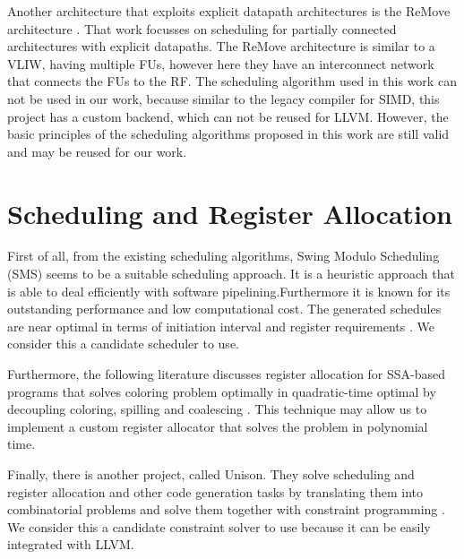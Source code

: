 Another architecture that exploits explicit datapath architectures is the ReMove architecture \cite{remove}. That work focusses on scheduling for partially connected architectures with explicit datapaths. The ReMove architecture is similar to a VLIW, having multiple FUs, however here they have an interconnect network that connects the FUs to the RF. The scheduling algorithm used in this work can not be used in our work, because similar to the legacy compiler for SIMD, this project has a custom backend, which can not be reused for LLVM. However, the basic principles of the scheduling algorithms proposed in this work are still valid and may be reused for our work.

\section{Scheduling and Register Allocation}
First of all, from the existing scheduling algorithms, Swing Modulo Scheduling (SMS) seems to be a suitable scheduling approach. It is a heuristic approach that is able to deal efficiently with software pipelining.Furthermore it is known for its outstanding performance and low computational cost. The generated schedules are near optimal in terms of initiation interval and register requirements \cite{swingmodulo_paper, swingmodulo_thesis}. We consider this a candidate scheduler to use.

Furthermore, the following literature discusses register allocation for SSA-based programs that solves coloring problem optimally in quadratic-time optimal by decoupling coloring, spilling and coalescing \cite{ra}. This technique may allow us to implement a custom register allocator that solves the problem in polynomial time.

Finally, there is another project, called Unison. They solve scheduling and register allocation and other code generation tasks by translating them into combinatorial problems and solve them together with constraint programming \cite{unison}. We consider this a candidate constraint solver to use because it can be easily integrated with LLVM.